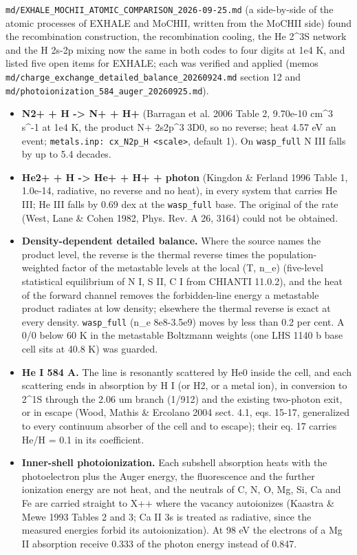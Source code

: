 \documentclass[english,a4paper]{my_memo}
\providecommand{\tightlist}{\setlength{\itemsep}{0pt}\setlength{\parskip}{0pt}}
\begin{document}
\texttt{md/EXHALE\_MOCHII\_ATOMIC\_COMPARISON\_2026-09-25.md} (a side-by-side of the
atomic processes of EXHALE and MoCHII, written from the MoCHII side) found the
recombination construction, the recombination cooling, the He 2\^{}3S network
and the H 2s-2p mixing now the same in both codes to four digits at 1e4 K,
and listed five open items for EXHALE; each was verified and applied (memos
\texttt{md/charge\_exchange\_detailed\_balance\_20260924.md} section 12 and
\texttt{md/photoionization\_584\_auger\_20260925.md}).

\begin{itemize}
\tightlist
\item
  \textbf{N2+ + H -\textgreater{} N+ + H+} (Barragan et al. 2006 Table 2, 9.70e-10 cm\^{}3 s\^{}-1 at
  1e4 K, the product N+ 2s2p\^{}3 3D0, so no reverse; heat 4.57 eV an event;
  \texttt{metals.inp:\ cx\_N2p\_H\ \textless{}scale\textgreater{}}, default 1). On \texttt{wasp\_full} N III falls by up
  to 5.4 decades.
\item
  \textbf{He2+ + H -\textgreater{} He+ + H+ + photon} (Kingdon \& Ferland 1996 Table 1, 1.0e-14,
  radiative, no reverse and no heat), in every system that carries He III;
  He III falls by 0.69 dex at the \texttt{wasp\_full} base. The original of the rate
  (West, Lane \& Cohen 1982, Phys. Rev. A 26, 3164) could not be obtained.
\item
  \textbf{Density-dependent detailed balance.} Where the source names the product
  level, the reverse is the thermal reverse times the population-weighted
  factor of the metastable levels at the local (T, n\_e) (five-level
  statistical equilibrium of N I, S II, C I from CHIANTI 11.0.2), and the
  heat of the forward channel removes the forbidden-line energy a metastable
  product radiates at low density; elsewhere the thermal reverse is exact at
  every density. \texttt{wasp\_full} (n\_e 8e8-3.5e9) moves by less than 0.2 per cent.
  A 0/0 below 60 K in the metastable Boltzmann weights (one LHS 1140 b base
  cell sits at 40.8 K) was guarded.
\item
  \textbf{He I 584 A.} The line is resonantly scattered by He0 inside the cell,
  and each scattering ends in absorption by H I (or H2, or a metal ion), in
  conversion to 2\^{}1S through the 2.06 um branch (1/912) and the existing
  two-photon exit, or in escape (Wood, Mathis \& Ercolano 2004 sect. 4.1,
  eqs. 15-17, generalized to every continuum absorber of the cell and to
  escape); their eq. 17 carries He/H = 0.1 in its coefficient.
\item
  \textbf{Inner-shell photoionization.} Each subshell absorption heats with the
  photoelectron plus the Auger energy, the fluorescence and the further
  ionization energy are not heat, and the neutrals of C, N, O, Mg, Si, Ca and
  Fe are carried straight to X++ where the vacancy autoionizes (Kaastra \&
  Mewe 1993 Tables 2 and 3; Ca II 3s is treated as radiative, since the
  measured energies forbid its autoionization). At 98 eV the electrons of a
  Mg II absorption receive 0.333 of the photon energy instead of 0.847.
\end{itemize}
\end{document}
